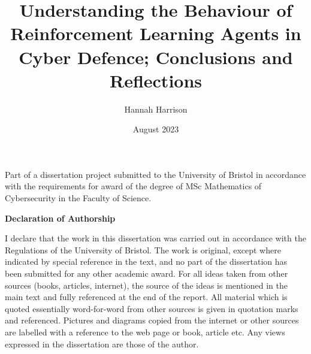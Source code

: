 \documentclass{article}
\title{Understanding the Behaviour of Reinforcement Learning Agents in Cyber Defence; Conclusions and Reflections}
\author{Hannah Harrison }
\date{August 2023}
\begin{document}
\maketitle

\vspace{1cm}
\begin{center}
    

\noindent Part of a dissertation project submitted to the University of Bristol in accordance with the requirements for award of the degree of MSc Mathematics of Cybersecurity in the Faculty of Science.

\end{center}

\newpage

\vspace{8cm}
\begin{center}
  \textbf{ \Large Declaration of Authorship}
  \vspace{0.5cm}

I declare that the work in this dissertation was carried out in accordance with the Regulations of the University of Bristol. The work is original, except where indicated by special reference in the text, and no part of the dissertation has been submitted for any other academic award. For all ideas taken from other sources (books, articles, internet), the source of the ideas is mentioned in the main text and fully referenced at the end of the report. All material which is quoted essentially word-for-word from other sources is given in quotation marks and referenced. Pictures and diagrams copied from the internet or other sources are labelled with a reference to the web page or book, article etc. Any views expressed in the dissertation are those of the author.


\end{center}




\newpage



\newpage 

\tableofcontents
\pagebreak

\end{document}
